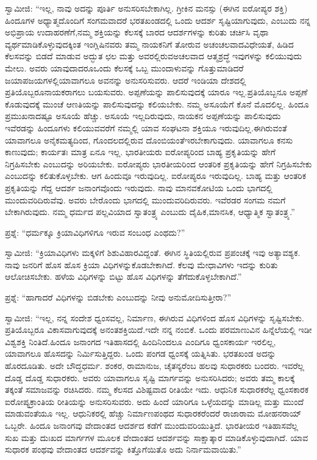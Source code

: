 ಸ್ವಾಮೀಜಿ: “ಇಲ್ಲ, ನಾವು ಅದನ್ನು ಪೂರ್ತಿ ಅನುಸರಿಸಬೇಕಾಗಿಲ್ಲ. ಗ್ರೀಕಿನ ಮನಸ್ಸು (ಈಗಿನ ಐರೋಪ್ಯರ ಶಕ್ತಿ) ಹಿಂದೂಗಳ ಅಧ್ಯಾತ್ಮದೊಂದಿಗೆ ಸಂಗಮವಾದರೆ ಭರತಖಂಡದಲ್ಲಿ ಒಂದು ಆದರ್ಶ ಸೃಷ್ಟಿಯಾಗುವುದು, ಎಂಬುದು ನನ್ನ ಅಭಿಪ್ರಾಯ ಉದಾಹರಣೆಗೆ,\break ನಮ್ಮ ಶಕ್ತಿಯನ್ನು ಕೆಲಸಕ್ಕೆ ಬಾರದ ಆದರ್ಶಗಳನ್ನು ಕುರಿತು ಚರ್ಚಿಸಿ ವೃಥಾ ವ್ಯರ್ಥಮಾಡಿ\-ಕೊಳ್ಳುವುದಕ್ಕಿಂತ ಇಂಗ್ಲಿಷಿನವರು ತಮ್ಮ ನಾಯಕನಿಗೆ ತೋರುವ ಅಚಂಚಲವಾದ\break ವಿಧೇಯತೆ, ಹಿಡಿದ ಕೆಲಸವನ್ನು ಬಿಡದೆ ಮಾಡುವ ಅದ್ಭುತ ಛಲ ಮತ್ತು ಅವರಲ್ಲಿರುವ\break ಅಚಲವಾದ ಆತ್ಮಶ್ರದ್ಧೆ ಇವುಗಳನ್ನು ಕಲಿಯುವುದು ಮೇಲು. ಅವರು ಯಾವುದಾದರೂ\break ಒಂದು ಕೆಲಸಕ್ಕೆ ಒಬ್ಬ ಮುಂದಾಳುವನ್ನು ಗೊತ್ತುಮಾಡಿದರೆ ಜಯಾಪಜಯಗಳಲ್ಲಿ\break ಯಾವಾಗಲೂ ಅವನನ್ನು ಅನುಸರಿಸುವರು. ಆದರೆ ಇಂಡಿಯಾ ದೇಶದಲ್ಲಿ ಪ್ರತಿಯೊಬ್ಬರೂ\break ನಾಯಕರಾಗಲು ಬಯಸುವರು. ಅಪ್ಪಣೆಯನ್ನು ಪಾಲಿಸುವುದಕ್ಕೆ ಯಾರೂ ಇಲ್ಲ.\break ಪ್ರತಿಯೊಬ್ಬನೂ ಅಪ್ಪಣೆ ಕೊಡುವುದಕ್ಕೆ ಮುಂಚೆ ಆಣತಿಯನ್ನು ಪಾಲಿಸುವುದನ್ನು ಕಲಿಯಬೇಕು. ನಮ್ಮ ಅಸೂಯೆಗೆ ಕೊನೆ ಮೊದಲಿಲ್ಲ. ಹಿಂದೂ ಪ್ರಮುಖನಾದಷ್ಟೂ ಅಸೂಯೆ ಹೆಚ್ಚು. ಅಸೂಯೆ ಇಲ್ಲದಿರುವುದು, ನಾಯಕನ ಅಪ್ಪಣೆಯನ್ನು ಪಾಲಿಸುವುದು ಇವೆರಡನ್ನು ಹಿಂದೂಗಳು ಕಲಿಯುವವರೆಗೆ ನಮ್ಮಲ್ಲಿ ಯಾವ ಸಂಘಟನಾ ಶಕ್ತಿಯೂ ಇರುವುದಿಲ್ಲ.\break ಈಗಿರುವಂತೆ ಯಾವಾಗಲೂ ಅನೈಕಮತ್ಯದಿಂದ, ಗೊಂದಲದಲ್ಲಿರುವ ದೊಂಬಿಯಂತೆ\break ಇರಬೇಕಾಗುವುದು. ಯಾವಾಗಲೂ ಕನಸು ಕಾಣುವುದು; ಕಾರ್ಯತಃ ಮಾತ್ರ ಏನೂ ಇಲ್ಲ. ಭಾರತೀಯರು ಐರೋಪ್ಯರಿಂದ ಬಾಹ್ಯ ಪ್ರಕೃತಿಯನ್ನು ಹೇಗೆ ನಿಗ್ರಹಿಸಬೇಕು ಎಂಬುದನ್ನು ಅರಿಯಬೇಕು. ಐರೋಪ್ಯರು ಭಾರತೀಯರಿಂದ ಆಂತರಿಕ ಪ್ರಕೃತಿಯನ್ನು ಹೇಗೆ ನಿಗ್ರಹಿಸಬೇಕು ಎಂಬುದನ್ನು ಕಲಿತುಕೊಳ್ಳಬೇಕು. ಆಗ ಹಿಂದುವೂ ಇರುವುದಿಲ್ಲ. ಐರೋಪ್ಯರೂ ಇರುವುದಿಲ್ಲ. ಬಾಹ್ಯ ಮತ್ತು ಆಂತರಿಕ ಪ್ರಕೃತಿಯನ್ನು ಗೆದ್ದ ಆದರ್ಶ ಜನಾಂಗವೊಂದು ಇರುವುದು. ನಾವು ಮಾನವಕೋಟಿಯ ಒಂದು ಭಾಗದಲ್ಲಿ ಮುಂದುವರಿದಿರುವೆವು. ಅವರು ಬೇರೊಂದು ಭಾಗದಲ್ಲಿ ಮುಂದುವರಿದಿರುವರು. ಇವೆರಡರ ಸಂಗಮ ನಮಗೆ ಬೇಕಾಗಿರುವುದು. ನಮ್ಮ ಧರ್ಮದ ಪಲ್ಲವಿಯಾದ ಸ್ವಾತಂತ್ರ್ಯ ಎಂಬುದು ದೈಹಿಕ,\break ಮಾನಸಿಕ, ಆಧ್ಯಾತ್ಮಿಕ ಸ್ವಾತಂತ್ರ್ಯ.”

ಪ್ರಶ್ನೆ: “ಧರ್ಮಕ್ಕೂ ಕ್ರಿಯಾವಿಧಿಗಳಿಗೂ ಇರುವ ಸಂಬಂಧ ಎಂಥದು?”

ಸ್ವಾಮೀಜಿ: “ಕ್ರಿಯಾವಿಧಿಗಳು ಮಕ್ಕಳಿಗೆ ಶಿಶುವಿಹಾರವಿದ್ದಂತೆ. ಈಗಿನ ಸ್ಥಿತಿಯಲ್ಲಿರುವ ಪ್ರಪಂಚಕ್ಕೆ ಇವು ಅತ್ಯಾವಶ್ಯಕ. ನಾವು ಜನರಿಗೆ ಹೊಸ ಹೊಸ ಕ್ರಿಯಾ ವಿಧಿಗಳನ್ನು\break ಕೊಡಬೇಕಾಗಿದೆ. ಕೆಲವು ಮೇಧಾವಿಗಳು ಇದನ್ನು ಕುರಿತು ಆಲೋಚಿಸಬೇಕು. ಹಳೆಯ ವಿಧಿಗಳನ್ನು ಬಿಟ್ಟು ಹೊಸ ವಿಧಿಗಳನ್ನು ತೆಗೆದುಕೊಳ್ಳಬೇಕಾಗಿದೆ.”

ಪ್ರಶ್ನೆ: “ಹಾಗಾದರೆ ವಿಧಿಗಳನ್ನು ಬಿಡಬೇಕು ಎಂಬುದನ್ನು ನೀವು ಅನುಮೋದಿಸು\-ತ್ತೀರಾ?”

ಸ್ವಾಮೀಜಿ: “ಇಲ್ಲ, ನನ್ನ ಸಂದೇಶ ಧ್ವಂಸವಲ್ಲ, ನಿರ್ಮಾಣ, ಈಗಿರುವ ವಿಧಿಗಳಿಂದ ಹೊಸ ವಿಧಿಗಳನ್ನು ಸೃಷ್ಟಿಸಬೇಕು. ಪ್ರತಿಯೊಬ್ಬರೂ ವಿಕಾಸವಾಗುವುದಕ್ಕೆ ಅನಂತಶಕ್ತಿಯಿದೆ.\break ಇದೇ ನನ್ನ ನಂಬಿಕೆ. ಒಂದು ಪರಮಾಣುವಿನ ಹಿನ್ನೆಲೆಯಲ್ಲಿ ಇಡೀ ವಿಶ್ವಶಕ್ತಿ ನಿಂತಿದೆ.\break ಹಿಂದೂ ಜನಾಂಗದ ಇತಿಹಾಸದಲ್ಲಿ ಹಿಂದಿನಿಂದಲೂ ಎಂದಿಗೂ ಧ್ವಂಸಕಾರ್ಯ ಇರಲಿಲ್ಲ, ಯಾವಾಗಲೂ ಹೊಸದನ್ನು ನಿರ್ಮಿಸುತ್ತಿದ್ದರು. ಒಂದು ಪಂಗಡ ಧ್ವಂಸಕ್ಕೆ ಯತ್ನಿಸಿತು. ಭರತಖಂಡ ಅದನ್ನು ಹೊರದೂಡಿತು. ಅದೇ ಬೌದ್ಧಧರ್ಮ. ಶಂಕರ, ರಾಮಾನುಜ, ಚೈತನ್ಯರೆಂಬ ಹಲವು ಸುಧಾರಕರು ಬಂದರು. ಇವರೆಲ್ಲ ದೊಡ್ಡ ದೊಡ್ಡ ಸುಧಾರಕರು. ಅವರು ಯಾವಾಗಲೂ ಸೃಷ್ಟಿ ಮಾರ್ಗವನ್ನು ಅನುಸರಿಸಿದರು; ಅವರು ತಮ್ಮ ಕಾಲಕ್ಕೆ ತಕ್ಕಂತೆ ಸಮಾಜವನ್ನು ರಚಿಸಿದರು. ನಮ್ಮ ಕೆಲಸದ ವಿಶಿಷ್ಟವಾದ ರೀತಿಯೇ ಇದು. ಆಧುನಿಕ ಸುಧಾರಕರೆಲ್ಲ ಧ್ವಂಸಕಾರಕ ಐರೋಪ್ಯಕ್ರಾಂತಿಯ ರೀತಿಯನ್ನು ಅನುಸರಿಸುವರು. ಅದು ಹಿಂದೆ ಯಾರಿಗೂ ಒಳ್ಳೆಯದನ್ನು ಮಾಡಿಲ್ಲ ಮತ್ತು ಮುಂದೆ ಮಾಡುವಂತೆಯೂ ಇಲ್ಲ. ಆಧುನಿಕರಲ್ಲಿ ಹೆಚ್ಚು ನಿರ್ಮಾಣಪಂಥದ ಸುಧಾರಕರೆಂದರೆ ರಾಜಾರಾಮ ಮೋಹನರಾಯ್​ ಒಬ್ಬರೇ. ಹಿಂದೂ ಜನಾಂಗವು ವೇದಾಂತದ ಆದರ್ಶದ ಕಡೆಗೆ ಮುಂದುವರಿಯುತ್ತಿದೆ. ಭಾರತೀಯರ ಇತಿಹಾಸವೆಲ್ಲ ಸುಖ ಮತ್ತು ದುಃಖದ ಮಾರ್ಗಗಳ ಮೂಲಕ ವೇದಾಂತದ ಆದರ್ಶವನ್ನು ಸಾಕ್ಷಾತ್ಕಾರ ಮಾಡಿಕೊಳ್ಳುವುದಾಗಿದೆ. ಯಾವ ಸುಧಾರಕ ಪಂಥವು ವೇದಾಂತದ ಆದರ್ಶವನ್ನು ಕಿತ್ತೊಗೆಯಿತೊ ಅದು ನಿರ್ನಾಮವಾಯಿತು.”

